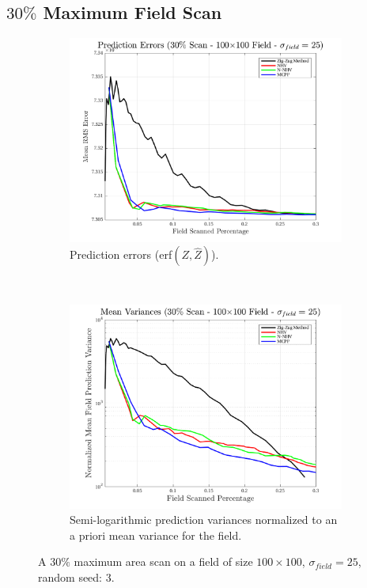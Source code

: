\FloatBarrier
\clearpage
\subsection{$30\%$ Maximum Field Scan}
\begin{figure}[htb!]
    \centering
    \begin{subfigure}[t]{0.65\textwidth}
        \centering
        \includegraphics[width=\linewidth]{figures/hbresults/pred_errs_30p_100x100_sf_25_seed_3.png}
        \captionsetup{skip=0.20\baselineskip,size=footnotesize}
        \caption{Prediction errors (erf$(Z,\hat{Z})$).}
        \label{fig:prederrs_sigma25_p30_s3}
    \end{subfigure}%
    \\
    \begin{subfigure}[t]{0.65\textwidth}
        \centering
        \includegraphics[width=\linewidth]{figures/hbresults/vars_30p_100x100_sf_25_seed_3.png}
        \captionsetup{skip=0.20\baselineskip,size=footnotesize}
        \caption{Semi-logarithmic prediction variances normalized to an a priori mean variance for the field.}
        \label{fig:prederrs_sigma25_p30_s3}
    \end{subfigure}
    \captionsetup{skip=0.20\baselineskip}
    \caption{A $30\%$ maximum area scan on a field of size $100 \times 100$, $\sigma_{field} = 25$, random seed: 3.}
    \label{fig:sigma25_p30_s3}
\end{figure}

